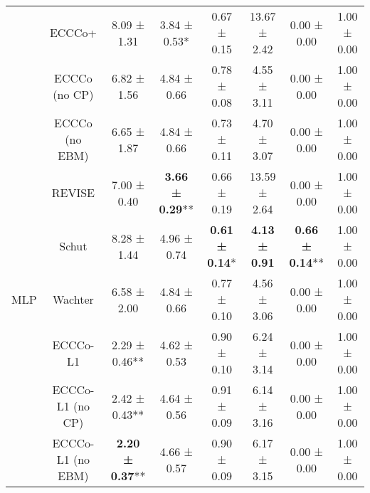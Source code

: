 \begin{table}
{\begin{tabular}[t]{cccccccc}
 & ECCCo+ & 8.09 ± 1.31\hphantom{*}\hphantom{*} & 3.84 ± 0.53*\hphantom{*} & 0.67 ± 0.15\hphantom{*}\hphantom{*} & 13.67 ± 2.42\hphantom{*}\hphantom{*} & 0.00 ± 0.00\hphantom{*}\hphantom{*} & 1.00 ± 0.00\hphantom{*}\hphantom{*}\\

 & ECCCo (no CP) & 6.82 ± 1.56\hphantom{*}\hphantom{*} & 4.84 ± 0.66\hphantom{*}\hphantom{*} & 0.78 ± 0.08\hphantom{*}\hphantom{*} & 4.55 ± 3.11\hphantom{*}\hphantom{*} & 0.00 ± 0.00\hphantom{*}\hphantom{*} & 1.00 ± 0.00\hphantom{*}\hphantom{*}\\

 & ECCCo (no EBM) & 6.65 ± 1.87\hphantom{*}\hphantom{*} & 4.84 ± 0.66\hphantom{*}\hphantom{*} & 0.73 ± 0.11\hphantom{*}\hphantom{*} & 4.70 ± 3.07\hphantom{*}\hphantom{*} & 0.00 ± 0.00\hphantom{*}\hphantom{*} & 1.00 ± 0.00\hphantom{*}\hphantom{*}\\

 & REVISE & 7.00 ± 0.40\hphantom{*}\hphantom{*} & \textbf{3.66 ± 0.29}** & 0.66 ± 0.19\hphantom{*}\hphantom{*} & 13.59 ± 2.64\hphantom{*}\hphantom{*} & 0.00 ± 0.00\hphantom{*}\hphantom{*} & 1.00 ± 0.00\hphantom{*}\hphantom{*}\\

 & Schut & 8.28 ± 1.44\hphantom{*}\hphantom{*} & 4.96 ± 0.74\hphantom{*}\hphantom{*} & \textbf{0.61 ± 0.14}*\hphantom{*} & \textbf{4.13 ± 0.91}\hphantom{*}\hphantom{*} & \textbf{0.66 ± 0.14}** & 1.00 ± 0.00\hphantom{*}\hphantom{*}\\

\multirow[t]{-10}{*}{\centering\arraybackslash MLP} & Wachter & 6.58 ± 2.00\hphantom{*}\hphantom{*} & 4.84 ± 0.66\hphantom{*}\hphantom{*} & 0.77 ± 0.10\hphantom{*}\hphantom{*} & 4.56 ± 3.06\hphantom{*}\hphantom{*} & 0.00 ± 0.00\hphantom{*}\hphantom{*} & 1.00 ± 0.00\hphantom{*}\hphantom{*}\\
\cmidrule{1-8}
 & ECCCo-L1 & 2.29 ± 0.46** & 4.62 ± 0.53\hphantom{*}\hphantom{*} & 0.90 ± 0.10\hphantom{*}\hphantom{*} & 6.24 ± 3.14\hphantom{*}\hphantom{*} & 0.00 ± 0.00\hphantom{*}\hphantom{*} & 1.00 ± 0.00\hphantom{*}\hphantom{*}\\

 & ECCCo-L1 (no CP) & 2.42 ± 0.43** & 4.64 ± 0.56\hphantom{*}\hphantom{*} & 0.91 ± 0.09\hphantom{*}\hphantom{*} & 6.14 ± 3.16\hphantom{*}\hphantom{*} & 0.00 ± 0.00\hphantom{*}\hphantom{*} & 1.00 ± 0.00\hphantom{*}\hphantom{*}\\

 & ECCCo-L1 (no EBM) & \textbf{2.20 ± 0.37}** & 4.66 ± 0.57\hphantom{*}\hphantom{*} & 0.90 ± 0.09\hphantom{*}\hphantom{*} & 6.17 ± 3.15\hphantom{*}\hphantom{*} & 0.00 ± 0.00\hphantom{*}\hphantom{*} & 1.00 ± 0.00\hphantom{*}\hphantom{*}\\


\end{tabular}}
\end{table}
